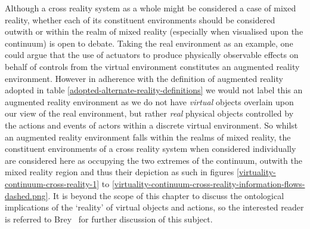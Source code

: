


Although a cross reality system as a whole might be considered a case of mixed reality, whether each of its constituent environments should be considered outwith or within the realm of mixed reality (especially when visualised upon the continuum) is open to debate. Taking the real environment as an example, one could argue that the use of actuators to produce physically observable effects on behalf of controls from the virtual environment constitutes an augmented reality environment. However in adherence with the definition of augmented reality adopted in table \ref{adopted-alternate-reality-definitions} we would not label this an augmented reality environment as we do not have \textit{virtual} objects overlain upon our view of the real environment, but rather \textit{real} physical objects controlled by the actions and events of actors within a discrete virtual environment. So whilst an augmented reality environment falls within the realms of mixed reality, the constituent environments of a cross reality system when considered individually are considered here as occupying the two extremes of the continuum, outwith the mixed reality region and thus their depiction as such in figures \ref{virtuality-continuum-cross-reality-1} to \ref{virtuality-continuum-cross-reality-information-flows-dashed.png}. It is beyond the scope of this chapter to discuss the ontological implications of the `reality' of virtual objects and actions, so the interested reader is referred to Brey~\cite{Brey2014} for further discussion of this subject.



